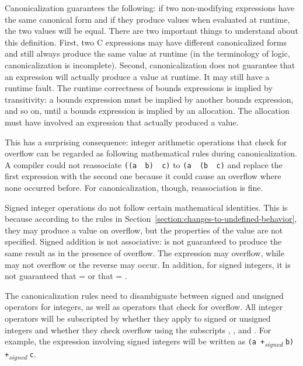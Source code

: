 Canonicalization guarantees the following: if two non-modifying
expressions have the same canonical form and if they produce values when
evaluated at runtime, the two values will be equal. There are two
important things to understand about this definition. First, two C
expressions may have different canonicalized forms and still always
produce the same value at runtime (in the terminology of logic,
canonicalization is incomplete). Second, canonicalization does not
guarantee that an expression will actually produce a value at runtime.
It may still have a runtime fault. The runtime correctness of bounds
expressions is implied by transitivity: a bounds expression must be
implied by another bounds expression, and so on, until a bounds
expression is implied by an allocation. The allocation must have
involved an expression that actually produced a value.

This has a surprising consequence: integer arithmetic operations that
check for overflow can be regarded as following mathematical rules
during canonicalization. A compiler could not reassociate \texttt{((a
\plusovf\ b) \plusovf\ c)} to \texttt{(a
\plusovf\ (b \plusovf\ c)} and replace the first
expression with the second one because it could cause an overflow where
none occurred before. For canonicalization, though, reassociation is
fine.

Signed integer operations do not follow certain mathematical identities.
This is because according to the rules in 
Section~\ref{section:changes-to-undefined-behavior}, they may produce
a value on overflow, but the properties of the value are not specified.
Signed addition is not associative:  is not
guaranteed to produce the same result as  in the
presence of overflow. The expression  may overflow, while
 may not overflow or the reverse may occur. In addition,
for signed integers, it is not guaranteed that  =
 or that  = .

The canonicalization rules need to disambiguate between signed and
unsigned operators for integers, as well as operators that check for
overflow. All integer operators will be subscripted by whether they
apply to signed or unsigned integers and whether they check overflow 
using the subscripts , , and
. For example, the expression  involving
signed integers will be written as \texttt{(a
+}\emph{\textsubscript{signed}} \texttt{b)
+}\emph{\textsubscript{signed}} \texttt{c}.

